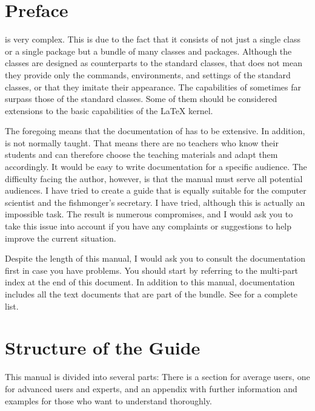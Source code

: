 \section{Preface}

{\KOMAScript} is very complex. This is due to the fact that it consists of not
just a single class or a single package but a bundle of many classes and
packages. Although the classes are designed as counterparts to the standard
classes, that does not mean they provide only the commands, environments, and
settings of the standard classes, or that they imitate their appearance. The
capabilities of {\KOMAScript} sometimes far surpass those of the standard
classes. Some of them should be considered extensions to the basic
capabilities of the \LaTeX{} kernel.

The foregoing means that the documentation of {\KOMAScript} has to be
extensive. In addition, {\KOMAScript} is not normally taught. That means there
are no teachers who know their students and can therefore choose the teaching
materials and adapt them accordingly. It would be easy to write documentation
for a specific audience. The difficulty facing the author, however, is that
the manual must serve all potential audiences. I have tried to create a guide
that is equally suitable for the computer scientist and the fishmonger's
secretary. I have tried, although this is actually an impossible task. The
result is numerous compromises, and I would ask you to take this issue into
account if you have any complaints or suggestions to help improve the current
situation.

Despite the length of this manual, I would ask you to consult the
documentation first in case you have problems. You should start by referring
to the multi-part index at the end of this document. In addition to this
manual, documentation includes all the text documents that are part of the
bundle. See  for a complete list.

\section{Structure of the Guide}

This manual is divided into several parts: There is a section for average
users, one for advanced users and experts, and an appendix with further
information and examples for those who want to understand {\KOMAScript}
thoroughly.

